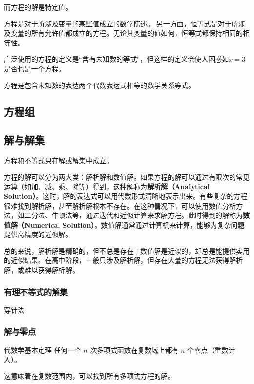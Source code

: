 而方程的解是特定值。


方程是对于所涉及变量的某些值成立的数学陈述。
另一方面，恒等式是对于所涉及变量的所有允许值都成立的方程。无论其变量的值如何，恒等式都保持相同的相等性。

广泛使用的方程的定义是“含有未知数的等式”，但这样的定义会使人困惑如$x=3$是否也是一个方程。

方程是包含未知数的表达两个代数表达式相等的数学关系等式。


\subsection{方程组}

\subsection{解与解集}

方程和不等式只在解或解集中成立。

方程的解可以分为两大类：解析解和数值解。如果方程的解可以通过有限次的常见运算（如加、减、乘、除等）得到，这种解称为\textbf{解析解（Analytical Solution）}。这时，解的表达式可以用代数形式清晰地表示出来。有些复杂的方程很难找到解析解，甚至解析解根本不存在。在这种情况下，可以使用数值分析方法，如二分法、牛顿法等，通过迭代和近似计算来求解方程。此时得到的解称为\textbf{数值解（Numerical Solution）}。数值解通常通过计算机来计算，能够为复杂问题提供高精度的近似解。

总的来说，解析解是精确的，但不总是存在；数值解是近似的，却总是能提供实用的近似结果。在高中阶段，一般只涉及解析解，但存在大量的方程无法获得解析解，或难以获得解析解。

\subsubsection{有理不等式的解集}

穿针法

\subsubsection{解与零点}

\begin{definition}{代数学基本定理}
任何一个 $n$ 次多项式函数在复数域上都有 $n$ 个零点（重数计入）。
\end{definition}
这意味着在复数范围内，可以找到所有多项式方程的解。



